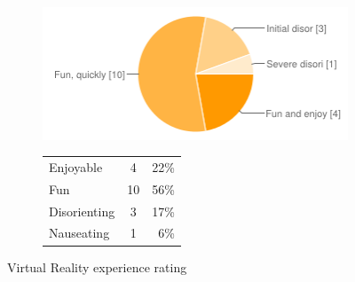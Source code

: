 \documentclass[MSc,paper=a4,pagesize=auto]{icldt}
\begin{document}
\begin{figure}[htbp!]
\centering
\begin{subfigure}{0.4\textwidth}
    \centering
    \includegraphics[width=1\linewidth]{resources/8-demonstration_experience}
\end{subfigure}%
\centering
\begin{subfigure}{0.5\textwidth}
    \centering
   	\begin{tabular}{ l c r }
Enjoyable&4&22\% \\
Fun&10&56\% \\
Disorienting&3&17\% \\
Nauseating&1&6\% \\
\end{tabular}
\end{subfigure} 
    \caption{Virtual Reality experience rating}
    \label{fig:8-demonstration_experience}
\end{figure}
\end{document}

